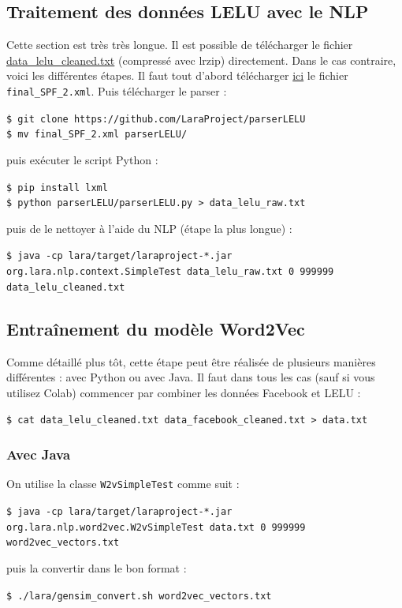 \documentclass[10pt,a4paper]{article}
\begin{document}
\subsection{Traitement des données LELU avec le NLP}
Cette section est très très longue. Il est possible de télécharger le fichier \href{https://github.com/LaraProject/notebooks/raw/master/data_lelu_cleaned.txt.lrz}{data\_lelu\_cleaned.txt} (compressé avec lrzip) directement. Dans le cas contraire, voici les différentes étapes. Il faut tout d'abord télécharger \href{https://www.kaggle.com/breandan/french-reddit-discussion}{ici} le fichier \texttt{final\_SPF\_2.xml}. Puis télécharger le parser :
\begin{center}
	\texttt{\$ git clone https://github.com/LaraProject/parserLELU} \\
	\texttt{\$ mv final\_SPF\_2.xml parserLELU/}
\end{center}
puis exécuter le script Python :
\begin{center}
	\texttt{\$ pip install lxml} \\
	\texttt{\$ python parserLELU/parserLELU.py > data\_lelu\_raw.txt}
\end{center}
puis de le nettoyer à l'aide du NLP (étape la plus longue) :
\begin{center}
	\texttt{\$ java -cp lara/target/laraproject-*.jar org.lara.nlp.context.SimpleTest data\_lelu\_raw.txt 0 999999 data\_lelu\_cleaned.txt}
\end{center}

\subsection{Entraînement du modèle Word2Vec}
Comme détaillé plus tôt, cette étape peut être réalisée de plusieurs manières différentes : avec Python ou avec Java. Il faut dans tous les cas (sauf si vous utilisez Colab) commencer par combiner les données Facebook et LELU :
\begin{center}
	\texttt{\$ cat data\_lelu\_cleaned.txt data\_facebook\_cleaned.txt > data.txt}
\end{center}

\subsubsection{Avec Java}
On utilise la classe \texttt{W2vSimpleTest} comme suit :
\begin{center}
	\texttt{\$ java -cp lara/target/laraproject-*.jar org.lara.nlp.word2vec.W2vSimpleTest data.txt 0 999999 word2vec\_vectors.txt}
\end{center}
puis la convertir dans le bon format :
\begin{center}
	\texttt{\$ ./lara/gensim\_convert.sh word2vec\_vectors.txt}
\end{center}
\end{document}
